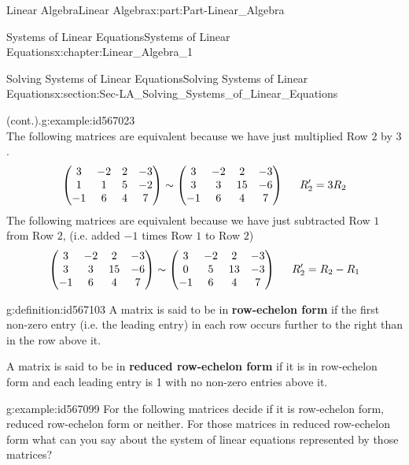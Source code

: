 \documentclass[oneside,10pt,]{book}
\newcommand{\terminology}[1]{\textbf{#1}}
\numberwithin{equation}{section}
\newcommand{\amp}{&}
\begin{document}
\begin{partptx}{Linear Algebra}{}{Linear Algebra}{}{}{x:part:Part-Linear_Algebra}
\begin{chapterptx}{Systems of Linear Equations}{}{Systems of Linear Equations}{}{}{x:chapter:Linear_Algebra_1}
\begin{sectionptx}{Solving Systems of Linear Equations}{}{Solving Systems of Linear Equations}{}{}{x:section:Sec-LA_Solving_Systems_of_Linear_Equations}
\begin{example}{(cont.).}{g:example:id567023}
\begin{equation*}
\end{equation*}
The following matrices are equivalent because we have just multiplied Row \(2\) by \(3\).%
\begin{equation*}
\begin{pmatrix} 3 \amp -2 \amp 2 \amp -3 \\ 1 \amp 1 \amp 5 \amp -2 \\ -1 \amp 6 \amp 4 \amp 7 \end{pmatrix} \sim \begin{pmatrix} 3 \amp -2 \amp 2 \amp -3 \\ 3 \amp 3 \amp 15 \amp -6 \\ -1 \amp 6 \amp 4 \amp 7 \end{pmatrix} \hspace{5mm} R_2'=3R_2 
\end{equation*}
The following matrices are equivalent because we have just subtracted Row \(1\) from Row \(2\), (i.e. added \(-1\) times Row \(1\) to Row \(2\))%
\begin{equation*}
\begin{pmatrix} 3 \amp -2 \amp 2 \amp -3 \\ 3 \amp 3 \amp 15 \amp -6 \\ -1 \amp 6 \amp 4 \amp 7 \end{pmatrix} \sim \begin{pmatrix} 3 \amp -2 \amp 2 \amp -3 \\ 0 \amp 5 \amp 13 \amp -3 \\ -1 \amp 6 \amp 4 \amp 7 \end{pmatrix} \hspace{5mm} R_2'=R_2-R_1
\end{equation*}
%
\end{example}
\begin{definition}{}{g:definition:id567103}%
A matrix is said to be in \terminology{row-echelon form} if the first non-zero entry (i.e. the leading entry) in each row occurs further to the right than in the row above it.%
\par
A matrix is said to be in \terminology{reduced row-echelon form} if it is in row-echelon form and each leading entry is 1 with no non-zero entries above it.%
\end{definition}
\begin{example}{}{g:example:id567099}%
For the following matrices decide if it is row-echelon form, reduced row-echelon form or neither. For those matrices in reduced row-echelon form what can you say about the system of linear equations represented by those matrices?%

\end{example}
\end{sectionptx}
\end{chapterptx}
\end{partptx}
\end{document}
